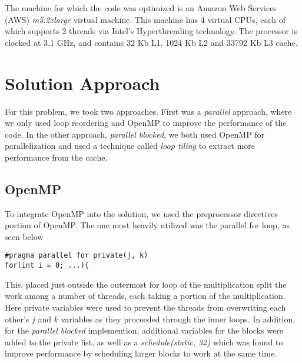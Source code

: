 \documentclass[letterpaper,twocolumn,10pt]{article}
\begin{document}
The machine for which the code was optimized is an Amazon Web Services (AWS)
\textit{m5.2xlarge} virtual machine. This machine has 4 virtual CPUs, each of
which supports 2 threads via Intel's Hyperthreading technology. The processor is
clocked at 3.1 GHz, and contains 32 Kb L1, 1024 Kb L2 and 33792 Kb L3 cache.

\section{Solution Approach}
For this problem, we took two approaches. First was a \textit{parallel} approach, where
we only used loop reordering and OpenMP to improve the performance of the code.
In the other approach, \textit{parallel blocked}, we both used OpenMP for parallelization
and used a technique called \textit{loop tiling} to extract more performance from
the cache.
\subsection{OpenMP}
To integrate OpenMP into the solution, we used the preprocessor directives portion
of OpenMP. The one most heavily utilized was the parallel for loop, as seen below
\begin{verbatim}
#pragma parallel for private(j, k)
for(int i = 0; ...){
\end{verbatim}
This, placed just outside the outermost for loop of the multiplication split the
work among a number of threads, each taking a portion of the multiplication.
Here private variables were used to prevent the threads from overwriting each
other's $j$ and $k$ variables as they proceeded through the inner loops. In addition,
for the \textit{parallel blocked} implemention, additional variables for the blocks
were added to the private list, as well as a \textit{schedule(static, 32)} which was
found to improve performance by scheduling larger blocks to work at the same time.
\end{document}
